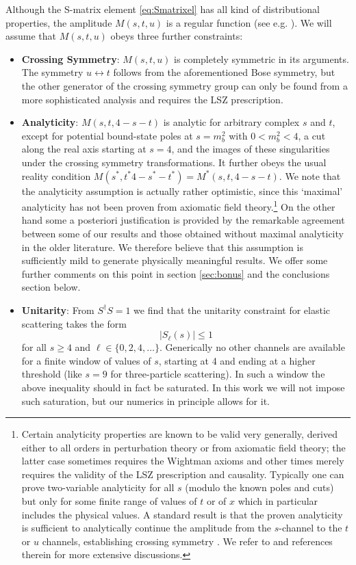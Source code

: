 \documentclass[12pt]{article}
\newcommand{\begBvR}[1]{\begin{#1}}
\newcommand{\beq}{\begBvR{equation}}
\newcommand{\eeq}{\end{equation}}
\newcommand{\<}{{\langle}}
\renewcommand{\>}{{\rangle}}
\begin{document}
Although the S-matrix element \eqref{eq:Smatrixel} has all kind of distributional properties, the amplitude $M(s,t,u)$ is a regular function (see e.g. \cite[section 4.3]{Weinberg:1995mt}). We will assume that $M(s,t,u)$ obeys three further constraints:
\begin{itemize}
  \item {\bf Crossing Symmetry}: $M(s,t,u)$ is completely symmetric in its arguments. The symmetry $u \leftrightarrow t$ follows from the aforementioned Bose symmetry, but the other generator of the crossing symmetry group can only be found from a more sophisticated analysis and requires the LSZ prescription.
  \item {\bf Analyticity}: $M(s,t,4 - s -t)$ is analytic for arbitrary complex $s$ and $t$, except for potential bound-state poles at $s = m_b^2$ with $0 < m_b^2 < 4$, a cut along the real axis starting at $s = 4$, and the images of these singularities under the crossing symmetry transformations. It further obeys the usual reality condition $M(s^*, t^* 4 - s^* - t^*) = M^*(s,t,4-s-t)$. We note that the analyticity assumption is actually rather optimistic, since this `maximal' analyticity has not been proven from axiomatic field theory.\footnote{%
  Certain analyticity properties are known to be valid very generally, derived either to all orders in perturbation theory or from axiomatic field theory; the latter case sometimes requires the Wightman axioms and other times merely requires the validity of the LSZ prescription and causality. Typically one can prove two-variable analyticity for all $s$ (modulo the known poles and cuts) but only for some finite range of values of $t$ or of $x$ which in particular includes the physical values. A standard result is that the proven analyticity is sufficient to analytically continue the amplitude from the $s$-channel to the $t$ or $u$ channels, establishing crossing symmetry \cite{Bros:1965kbd}. We refer to \cite{Martin:944356,Bjorken:1965zz} and references therein for more extensive discussions.
  }
  On the other hand some a posteriori justification is provided by the remarkable agreement between some of our results and those obtained without maximal analyticity in the older literature. We therefore believe that this assumption is sufficiently mild to generate physically meaningful results. We offer some further comments on this point in section \ref{sec:bonus} and the conclusions section below.
  \item {\bf Unitarity}: From $S^\dagger S = 1$ we find that the unitarity constraint for elastic scattering takes the form
    \beq\label{eq:unitarity}
  \left|S_\ell(s) \right| \leq  1 
  \eeq
  for all $s \geq 4$ and $\ell \in \{0,2,4,\ldots\}$. Generically no other channels are available for a finite window of values of $s$, starting at 4 and ending at a higher threshold (like $s = 9$ for three-particle scattering). In such a window the above inequality should in fact be saturated. In this work we will  not impose such saturation, but our numerics in principle allows for it.
\end{itemize}
\end{document}
